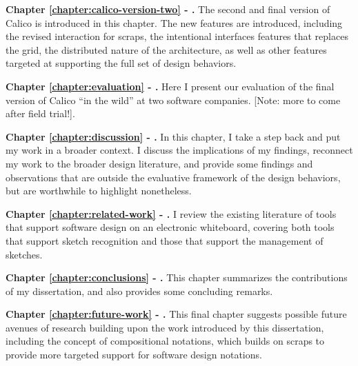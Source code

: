 \textbf{Chapter \ref{chapter:calico-version-two} - .} The second and final version of Calico is introduced in this chapter. The new features are introduced, including the revised interaction for scraps, the intentional interfaces features that replaces the grid, the distributed nature of the architecture, as well as other features targeted at supporting the full set of design behaviors.

\textbf{Chapter \ref{chapter:evaluation} - .} Here I present our evaluation of the final version of Calico ``in the wild'' at two software companies. [Note: more to come after field trial!].

\textbf{Chapter \ref{chapter:discussion} - .} In this chapter, I take a step back and put my work in a broader context. I discuss the implications of my findings, reconnect my work to the broader design literature, and provide some findings and observations that are outside the evaluative framework of the design behaviors, but are worthwhile to highlight nonetheless. 

\textbf{Chapter \ref{chapter:related-work} - .} I review the existing literature of tools that support software design on an electronic whiteboard, covering both tools that support sketch recognition and those that support the management of sketches.

\textbf{Chapter \ref{chapter:conclusions} - .} This chapter summarizes the contributions of my dissertation, and also provides some concluding remarks.

\textbf{Chapter \ref{chapter:future-work} - .} This final chapter suggests possible future avenues of research building upon the work introduced by this dissertation, including the concept of compositional notations, which builds on scraps to provide more targeted support for software design notations.

